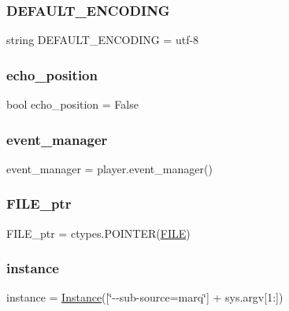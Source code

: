 \subsubsection{\texorpdfstring{D\+E\+F\+A\+U\+L\+T\+\_\+\+E\+N\+C\+O\+D\+I\+NG}{DEFAULT\_ENCODING}}
{\footnotesize\ttfamily string D\+E\+F\+A\+U\+L\+T\+\_\+\+E\+N\+C\+O\+D\+I\+NG = \textquotesingle{}utf-\/8\textquotesingle{}}

\mbox{\label{namespacevlc_a65d3edd39984571c052e38ddc4455267}} 
\subsubsection{\texorpdfstring{echo\+\_\+position}{echo\_position}}
{\footnotesize\ttfamily bool echo\+\_\+position = False}

\mbox{\label{namespacevlc_af1c54e30e2e3ab4f89adf23ede0db23e}} 
\subsubsection{\texorpdfstring{event\+\_\+manager}{event\_manager}}
{\footnotesize\ttfamily event\+\_\+manager = player.\+event\+\_\+manager()}

\mbox{\label{namespacevlc_ac4b5cdcbcf94f4dbe7eb3007f11fe7c0}} 
\subsubsection{\texorpdfstring{F\+I\+L\+E\+\_\+ptr}{FILE\_ptr}}
{\footnotesize\ttfamily F\+I\+L\+E\+\_\+ptr = ctypes.\+P\+O\+I\+N\+T\+ER(\hyperlink{classvlc_1_1_f_i_l_e}{F\+I\+LE})}

\mbox{\label{namespacevlc_a5ffaf17e178b3a6fa2012fe3050ede22}} 
\subsubsection{\texorpdfstring{instance}{instance}}
{\footnotesize\ttfamily instance = \hyperlink{classvlc_1_1_instance}{Instance}(\mbox{[}\char`\"{}-\/-\/sub-\/source=marq\char`\"{}\mbox{]} + sys.\+argv\mbox{[}1\+:\mbox{]})}

